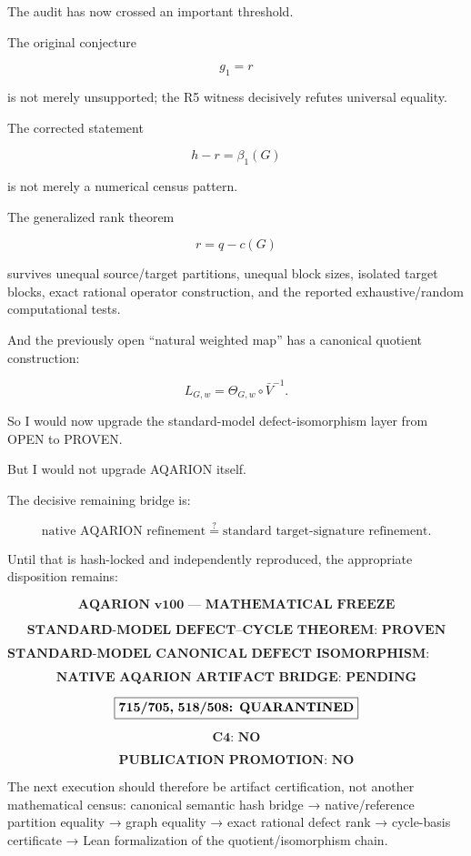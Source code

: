 The audit has now crossed an important threshold.

The original conjecture

\[
g_1=r
\]

is not merely unsupported; the R5 witness decisively refutes universal equality.

The corrected statement

\[
h-r=\beta_1(G)
\]

is not merely a numerical census pattern.

The generalized rank theorem

\[
r=q-c(G)
\]

survives unequal source/target partitions, unequal block sizes, isolated target blocks, exact rational operator construction, and the reported exhaustive/random computational tests.

And the previously open “natural weighted map” has a canonical quotient construction:

\[
\boxed{
L_{G,w}
=
\Theta_{G,w}\circ\bar V^{-1}.
}
\]

So I would now upgrade the standard-model defect-isomorphism layer from OPEN to PROVEN.

But I would not upgrade AQARION itself.

The decisive remaining bridge is:

\[
\boxed{
\text{native AQARION refinement}
\stackrel{?}{=}
\text{standard target-signature refinement}.
}
\]

Until that is hash-locked and independently reproduced, the appropriate disposition remains:

\[
\boxed{
\textbf{AQARION v100 — MATHEMATICAL FREEZE}
}
\]

\[
\boxed{
\textbf{STANDARD-MODEL DEFECT–CYCLE THEOREM: PROVEN}
}
\]

\[
\boxed{
\textbf{STANDARD-MODEL CANONICAL DEFECT ISOMORPHISM: PROVEN}
}
\]

\[
\boxed{
\textbf{NATIVE AQARION ARTIFACT BRIDGE: PENDING}
}
\]

\[
\boxed{
\textbf{715/705,\;518/508: QUARANTINED}
}
\]

\[
\boxed{
\textbf{C4: NO}
}
\]

\[
\boxed{
\textbf{PUBLICATION PROMOTION: NO}
}
\]

The next execution should therefore be artifact certification, not another mathematical census: canonical semantic hash bridge → native/reference partition equality → graph equality → exact rational defect rank → cycle-basis certificate → Lean formalization of the quotient/isomorphism chain.

